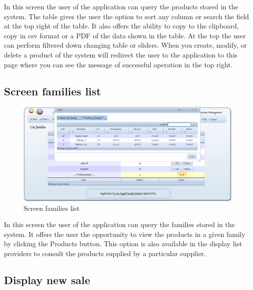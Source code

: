 \documentclass[a4paper,11pt]{book}
\begin{document}
In this screen the user of the application can query the products stored in the system. The table gives the user the option to sort any column or search the field at the top right of the table. It also offers the ability to copy to the clipboard, copy in csv format or a PDF of the data shown in the table. At the top the user can perform filtered down changing table or sliders. When you create, modify, or delete a product of the system will redirect the user to the application to this page where you can see the message of successful operation in the top right.


\newpage
\subsection {Screen families list}

\begin{figure}[!htb]
  \centering
    \includegraphics[scale=0.35]{icaplistarfamilias.png}
  \caption{Screen families list}
  \label{a}
\end{figure}

In this screen the user of the application can query the families stored in the system. It offers the user the opportunity to view the products in a given family by clicking the Products button. This option is also available in the display list providers to consult the products supplied by a particular supplier.

\newpage
\subsection {Display new sale}
\end{document}
